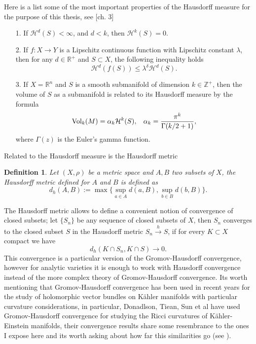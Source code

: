 \documentclass[12pt,twoside,a4paper]{report}
\newtheorem{definition}{Definition}[section]
\newcommand{\zah}{\ensuremath{ \mathbb Z }}
\newcommand{\re}{\ensuremath{\mathbb R }}
\begin{document}
Here is a list some of the most important properties of the Hausdorff measure for the purpose of this thesis, see \cite{Stolzenberg}[ch. 3]

\begin{enumerate}
        \item[1.] If $\mathcal{H}^d(S)<\infty$, and $d<k$, then $\mathcal{H}^k(S)=0$.\\

        \item[2.] If $f:X\rightarrow Y$ is a Lipschitz continuous function with
        Lipschitz constant $\lambda$, then for any $d\in\re^{+}$ and
        $S\subset X$, the following inequality holds
        \[
        \mathcal{H}^d(f(S))\leq\lambda^{\delta}\mathcal{H}^d(S).
        \]
        \item[3.]If $X=\re^{n}$ and $S$ is a smooth submanifold of dimension
        $k\in\zah^{+}$, then the volume of $S$ as a submanifold is related to
        its Hausdorff measure by the formula
        \[
        \textrm{Vol}_{k}(M)=\alpha_{k}\mathcal{H}^k(S),\hspace*{0.3cm}\alpha_k= \frac{\pi^k}{\Gamma(k/2+1)},
        \]
\noindent where $\Gamma(z)$ is the Euler's gamma function.
\end{enumerate}
Related to the Hausdorff measure is the Hausdorff metric
\begin{definition}
Let $(X,\rho)$ be a metric space and $A,B$ two subsets of $X$, the Hausdorff metric defined for $A$
and $B$ is defined as
\[
d_h(A,B):= \max\Big\{\sup_{a\in A}d(a,B),\sup_{b\in B}d(b,B)\Big\}.
\]
\end{definition}
The Hausdorff metric allows to define a convenient notion of convergence of closed subsets; let $\{S_n \}$ be any sequence of closed subsets of $X$, then $S_n$ converges to the closed subset $S$ in the Hausdorff metric $S_n\overset{h}\rightarrow S$, if for every $K\subset X$ compact we have
\[
  d_h(K\cap S_n,K\cap S)\rightarrow 0.
\]
\noindent This convergence is a particular version of the Gromov-Hausdorff convergence, however for analytic varieties it is enough to work with Hausdorff convergence instead of the more complex theory of Gromov-Hausdorff convergence. Its worth mentioning that Gromov-Hausdorff convergence has been used in recent years for the study of holomorphic vector bundles on Kähler manifolds with particular curvature considerations, in particular, Donadlson, Tiean, Sun et al have used Gromov-Hausdorff convergence for studying the Ricci curvatures of Kähler-Einstein manifolds, their convergence results share some resembrance to the ones I expose here and its worth asking about how far this similarities go (see \cite{Donadlson-Sun} \cite{tian}).
\end{document}
